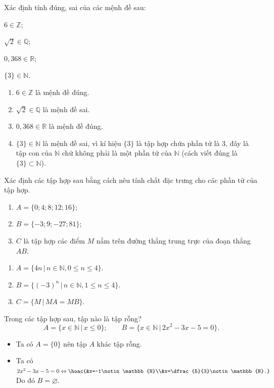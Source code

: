 \begin{bt}%
	Xác định tính đúng, sai của các mệnh đề sau:
	\begin{listEX}[4]
		\item $6\in \mathbb{Z}$;
		\item $\sqrt{2} \in \mathbb{Q}$;
		\item $0{,}368 \in \mathbb{R}$;
		\item $\{3\} \in \mathbb{N}$.
	\end{listEX}
	\loigiai
	{
		\begin{enumerate}
			\item $6 \in \mathbb{Z}$ là mệnh đề đúng.
			\item $\sqrt{2} \in \mathbb{Q}$ là mệnh đề sai.
			\item $0{,}368 \in \mathbb{R}$ là mệnh đề đúng.
			\item $\{3\} \in \mathbb{N}$ là mệnh đề sai, vì kí hiệu $\{3\}$ là tập hợp chứa phần tử là $3$, đây là tập con của $\mathbb{N}$ chứ không phải là một phần tử của $\mathbb{N}$ (cách viết đúng là $\{3\} \subset \mathbb{N}$).
		\end{enumerate}
	}
\end{bt}

\begin{bt}%
	Xác định các tập hợp sau bằng cách nêu tính chất đặc trưng cho các phần tử của tập hợp.
	\begin{enumerate}
		\item $A=\{0; 4; 8; 12; 16\}$;
		\item $B=\{-3;9;-27;81\}$;
		\item $C$ là tập hợp các điểm $M$ nằm trên đường thẳng trung trực của đoạn thẳng $AB$.
	\end{enumerate}
	\loigiai
	{
		\begin{enumerate}
			\item $A=\{4n\,|\, n\in\mathbb{N}, 0\le n\le 4\}$.
			\item $B=\{(-3)^n\,|\, n\in\mathbb{N}, 1\le n\le 4\}$.
			\item $C=\{M\,|\,MA=MB\}$.
		\end{enumerate}	
	}
\end{bt}

\begin{bt}%
	Trong các tập hợp sau, tập nào là tập rỗng?
	\[A=\{x\in\mathbb{N}\,|\,x\le 0\};\qquad B=\{x\in\mathbb{N}\,|\,2x^2-3x-5=0\}.\]
	\loigiai
	{
		\begin{itemize}
			\item Ta có $A=\{0\}$ nên tập $A$ khác tập rỗng.
			\item Ta có $2x^2-3x-5=0\Leftrightarrow \hoac{&x=-1\notin\mathbb{N}\\&x=\dfrac{5}{3}\notin\mathbb{N}.}$\\
			Do đó $B=\varnothing$.
		\end{itemize}
	}
\end{bt}

